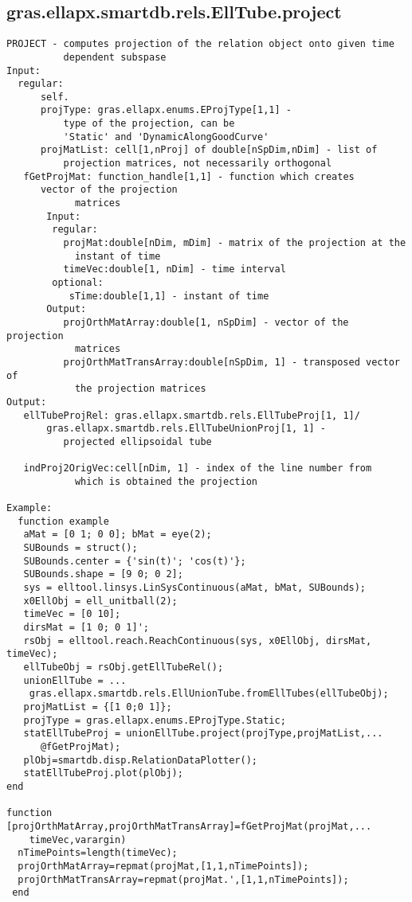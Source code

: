 \subsection{\texorpdfstring{gras.ellapx.smartdb.rels.EllTube.project}{project}}\label{method:gras.ellapx.smartdb.rels.EllTube.project}
\begin{verbatim}
PROJECT - computes projection of the relation object onto given time
          dependent subspase
Input:
  regular:
      self.
      projType: gras.ellapx.enums.EProjType[1,1] -
          type of the projection, can be
          'Static' and 'DynamicAlongGoodCurve'
      projMatList: cell[1,nProj] of double[nSpDim,nDim] - list of
          projection matrices, not necessarily orthogonal
   fGetProjMat: function_handle[1,1] - function which creates
      vector of the projection
            matrices
       Input:
        regular:
          projMat:double[nDim, mDim] - matrix of the projection at the
            instant of time
          timeVec:double[1, nDim] - time interval
        optional:
           sTime:double[1,1] - instant of time
       Output:
          projOrthMatArray:double[1, nSpDim] - vector of the projection
            matrices
          projOrthMatTransArray:double[nSpDim, 1] - transposed vector of
            the projection matrices
Output:
   ellTubeProjRel: gras.ellapx.smartdb.rels.EllTubeProj[1, 1]/
       gras.ellapx.smartdb.rels.EllTubeUnionProj[1, 1] -
          projected ellipsoidal tube

   indProj2OrigVec:cell[nDim, 1] - index of the line number from
            which is obtained the projection

Example:
  function example
   aMat = [0 1; 0 0]; bMat = eye(2);
   SUBounds = struct();
   SUBounds.center = {'sin(t)'; 'cos(t)'};
   SUBounds.shape = [9 0; 0 2];
   sys = elltool.linsys.LinSysContinuous(aMat, bMat, SUBounds);
   x0EllObj = ell_unitball(2);
   timeVec = [0 10];
   dirsMat = [1 0; 0 1]';
   rsObj = elltool.reach.ReachContinuous(sys, x0EllObj, dirsMat, timeVec);
   ellTubeObj = rsObj.getEllTubeRel();
   unionEllTube = ...
    gras.ellapx.smartdb.rels.EllUnionTube.fromEllTubes(ellTubeObj);
   projMatList = {[1 0;0 1]};
   projType = gras.ellapx.enums.EProjType.Static;
   statEllTubeProj = unionEllTube.project(projType,projMatList,...
      @fGetProjMat);
   plObj=smartdb.disp.RelationDataPlotter();
   statEllTubeProj.plot(plObj);
end

function [projOrthMatArray,projOrthMatTransArray]=fGetProjMat(projMat,...
    timeVec,varargin)
  nTimePoints=length(timeVec);
  projOrthMatArray=repmat(projMat,[1,1,nTimePoints]);
  projOrthMatTransArray=repmat(projMat.',[1,1,nTimePoints]);
 end
\end{verbatim}
